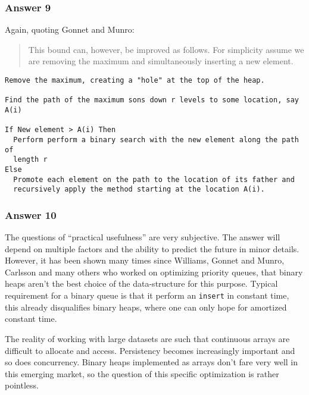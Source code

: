 \documentclass[11pt]{article}
\begin{document}
\subsubsection{Answer 9}
\label{sec:orgheadline13}
Again, quoting Gonnet and Munro:

\begin{quote}
This bound can, however, be improved as follows.  For simplicity assume we
are removing the maximum and simultaneously inserting a new element.
\end{quote}

\begin{verbatim}
Remove the maximum, creating a "hole" at the top of the heap.

Find the path of the maximum sons down r levels to some location, say A(i)

If New element > A(i) Then
  Perform perform a binary search with the new element along the path of
  length r
Else
  Promote each element on the path to the location of its father and
  recursively apply the method starting at the location A(i).
\end{verbatim}

\subsubsection{Answer 10}
\label{sec:orgheadline14}
The questions of ``practical usefulness'' are very subjective.  The answer
will depend on multiple factors and the ability to predict the future in
minor details.  However, it has been shown many times since Williams, Gonnet
and Munro, Carlsson and many others who worked on optimizing priority
queues, that binary heaps aren't the best choice of the data-structure for
this purpose.  Typical requirement for a binary queue is that it perform an
\texttt{insert} in constant time, this already disqualifies binary heaps, where one
can only hope for amortized constant time.

The reality of working with large datasets are such that continuous arrays
are difficult to allocate and access.  Persistency becomes increasingly
important and so does concurrency.  Binary heaps implemented as arrays don't
fare very well in this emerging market, so the question of this specific
optimization is rather pointless.
\end{document}

